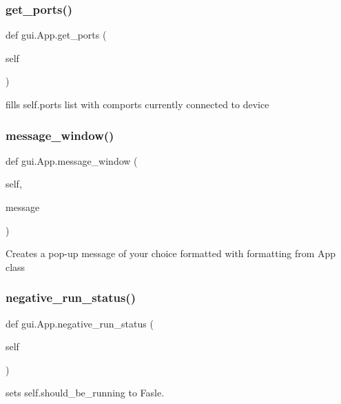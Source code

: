 \subsubsection{\texorpdfstring{get\_ports()}{get\_ports()}}
{\footnotesize\ttfamily def gui.\+App.\+get\+\_\+ports (\begin{DoxyParamCaption}\item[{}]{self }\end{DoxyParamCaption})}

\begin{DoxyVerb}fills self.ports list with comports currently connected to device
\end{DoxyVerb}
 \mbox{\label{classgui_1_1_app_aff435c92fd81d28c0d55ebb4ff8070cc}} 
\subsubsection{\texorpdfstring{message\_window()}{message\_window()}}
{\footnotesize\ttfamily def gui.\+App.\+message\+\_\+window (\begin{DoxyParamCaption}\item[{}]{self,  }\item[{}]{message }\end{DoxyParamCaption})}

\begin{DoxyVerb}Creates a pop-up message of your choice formatted with
formatting from App class\end{DoxyVerb}
 \mbox{\label{classgui_1_1_app_acf736cd539fe969738a7f74d8232d2fb}} 
\subsubsection{\texorpdfstring{negative\_run\_status()}{negative\_run\_status()}}
{\footnotesize\ttfamily def gui.\+App.\+negative\+\_\+run\+\_\+status (\begin{DoxyParamCaption}\item[{}]{self }\end{DoxyParamCaption})}

\begin{DoxyVerb}sets self.should_be_running to Fasle.
\end{DoxyVerb}
 \mbox{\label{classgui_1_1_app_a22e63face73987f9e878a95ced47bbfe}} 
